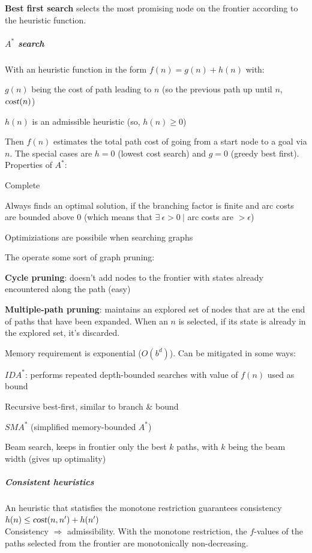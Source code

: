 \documentclass[10pt]{report}
\begin{document}
\textbf{Best first search} selects the most promising node on the frontier according to the heuristic function.
\subparagraph{$A^*$ search} With an heuristic function in the form $f(n) = g(n) + h(n)$ with:
\begin{list}{}{}
	\item $g(n)$ being the cost of path leading to $n$ (so the previous path up until $n$, $\textsl{cost}(n)$)
	\item $h(n)$ is an admissible heuristic (so, $h(n) \geq 0$)
\end{list}
Then $f(n)$ estimates the total path cost of going from a start node to a goal via $n$. The special cases are $h = 0$ (lowest cost search) and $g = 0$ (greedy best first).\\
Properties of $A^*$:\begin{list}{}{}
	\item Complete
	\item Always finds an optimal solution, if the branching factor is finite and arc costs are bounded above 0 (which means that $\exists\:\epsilon > 0\:|$ arc costs are $> \epsilon$)
	\item Optimiziations are possibile when searching graphs
	\item The operate some sort of graph pruning:
	\begin{list}{}{}
		\item \textbf{Cycle pruning}: doesn't add nodes to the frontier with states already encountered along the path (easy)
		\item \textbf{Multiple-path pruning}: maintains an explored set of nodes that are at the end of paths that have been expanded. When an $n$ is selected, if its state is already in the explored set, it's discarded.
	\end{list}
	\item Memory requirement is exponential ($O(b^d)$). Can be mitigated in some ways:
	\begin{list}{}{}
		\item $IDA^*$: performs repeated depth-bounded searches with value of $f(n)$ used as bound
		\item Recursive best-first, similar to branch \& bound
		\item $SMA^*$ (simplified memory-bounded $A^*$)
		\item Beam search, keeps in frontier only the best $k$ paths, with $k$ being the beam width (gives up optimality)
	\end{list}
\end{list}
\subparagraph{Consistent heuristics} An heuristic that statisfies the monotone restriction guarantees consistency $h(n) \leq \textsl{cost}(n, n') + h(n')$\\
Consistency $\Rightarrow$ admissibility. With the monotone restriction, the $f$-values of the paths selected from the frontier are monotonically non-decreasing.
\end{document}
